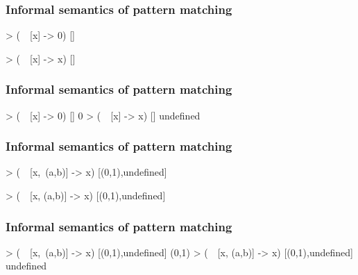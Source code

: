 \documentclass{beamer}
\begin{document}

\begin{frame}[fragile]
  \frametitle{Informal semantics of pattern matching}

  \begin{example}
    \begin{code}
> (\ ~[x] -> 0) []

> (\ ~[x] -> x) []

    \end{code}
  \end{example}
\end{frame}

\begin{frame}[fragile]
  \frametitle{Informal semantics of pattern matching}

  \begin{example}
    \begin{code}
> (\ ~[x] -> 0) []
0
> (\ ~[x] -> x) []
undefined
    \end{code}
  \end{example}
\end{frame}


\begin{frame}[fragile]
  \frametitle{Informal semantics of pattern matching}

  \begin{example}
    \begin{code}
> (\ ~[x,~(a,b)] -> x) [(0,1),undefined]

> (\ ~[x, (a,b)] -> x) [(0,1),undefined]

    \end{code}
  \end{example}
\end{frame}

\begin{frame}[fragile]
  \frametitle{Informal semantics of pattern matching}

  \begin{example}
    \begin{code}
> (\ ~[x,~(a,b)] -> x) [(0,1),undefined]
(0,1)
> (\ ~[x, (a,b)] -> x) [(0,1),undefined]
undefined
    \end{code}
  \end{example}
\end{frame}

\end{document}
